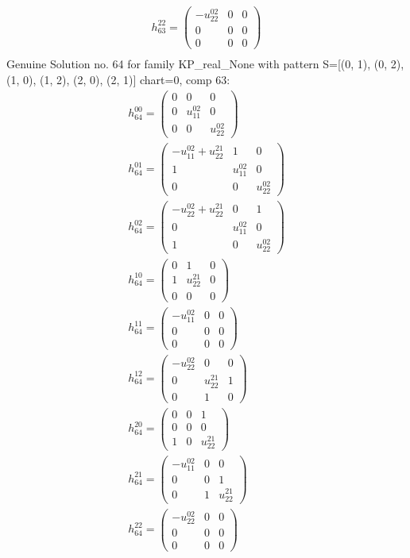 \documentclass[a4paper, 11pt, twoside, onecolumn]{article}
\begin{document}
\begin{landscape}
\begin{gather*}
	 h_{63}^{22}=\begin{pmatrix}- u^{02}_{22} & 0 & 0\\0 & 0 & 0\\0 & 0 & 0\end{pmatrix}\\ 
\end{gather*} 
Genuine Solution no. 64 for family KP_real_None with pattern S=[(0, 1), (0, 2), (1, 0), (1, 2), (2, 0), (2, 1)] chart=0, comp 63: 
\begin{gather*} 
	 h_{64}^{00}=\begin{pmatrix}0 & 0 & 0\\0 & u^{02}_{11} & 0\\0 & 0 & u^{02}_{22}\end{pmatrix}\\ 
	 h_{64}^{01}=\begin{pmatrix}- u^{02}_{11} + u^{21}_{22} & 1 & 0\\1 & u^{02}_{11} & 0\\0 & 0 & u^{02}_{22}\end{pmatrix}\\ 
	 h_{64}^{02}=\begin{pmatrix}- u^{02}_{22} + u^{21}_{22} & 0 & 1\\0 & u^{02}_{11} & 0\\1 & 0 & u^{02}_{22}\end{pmatrix}\\ 
	 h_{64}^{10}=\begin{pmatrix}0 & 1 & 0\\1 & u^{21}_{22} & 0\\0 & 0 & 0\end{pmatrix}\\ 
	 h_{64}^{11}=\begin{pmatrix}- u^{02}_{11} & 0 & 0\\0 & 0 & 0\\0 & 0 & 0\end{pmatrix}\\ 
	 h_{64}^{12}=\begin{pmatrix}- u^{02}_{22} & 0 & 0\\0 & u^{21}_{22} & 1\\0 & 1 & 0\end{pmatrix}\\ 
	 h_{64}^{20}=\begin{pmatrix}0 & 0 & 1\\0 & 0 & 0\\1 & 0 & u^{21}_{22}\end{pmatrix}\\ 
	 h_{64}^{21}=\begin{pmatrix}- u^{02}_{11} & 0 & 0\\0 & 0 & 1\\0 & 1 & u^{21}_{22}\end{pmatrix}\\ 
	 h_{64}^{22}=\begin{pmatrix}- u^{02}_{22} & 0 & 0\\0 & 0 & 0\\0 & 0 & 0\end{pmatrix}\\ 
\end{gather*} 


\end{landscape}
\end{document}
